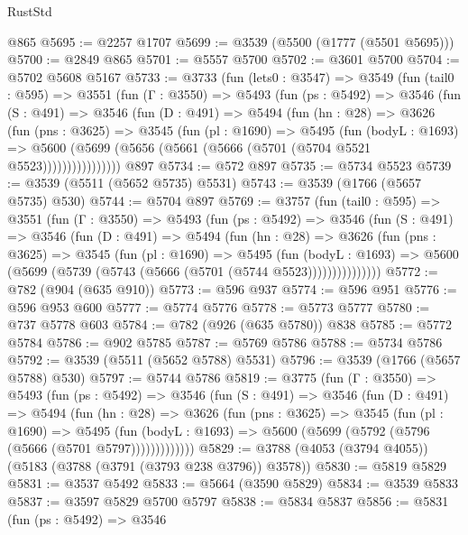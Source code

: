 \begin{lexlean}{RustStd}
\begin{coremodule}
    @865
@5695 := @2257 @1707
@5699 := @3539 (@5500 (@1777 (@5501 @5695)))
@5700 := @2849 @865
@5701 := @5557 @5700
@5702 := @3601 @5700
@5704 := @5702 @5608 @5167
@5733 := @3733
    (fun (lets0 : @3547) =>
    @3549
      (fun (tail0 : @595) =>
      @3551
        (fun (Γ : @3550) =>
        @5493
          (fun (ps : @5492) =>
          @3546
            (fun (S : @491) =>
            @3546
              (fun (D : @491) =>
              @5494
                (fun (hn : @28) =>
                @3626
                  (fun (pns : @3625) =>
                  @3545
                    (fun (pl : @1690) =>
                    @5495
                      (fun (bodyL : @1693) =>
                      @5600 (@5699 (@5656 (@5661 (@5666 (@5701 (@5704 @5521 @5523))))))))))))))))
    @897
@5734 := @572 @897
@5735 := @5734 @5523
@5739 := @3539 (@5511 (@5652 @5735) @5531)
@5743 := @3539 (@1766 (@5657 @5735) @530)
@5744 := @5704 @897
@5769 := @3757
    (fun (tail0 : @595) =>
    @3551
      (fun (Γ : @3550) =>
      @5493
        (fun (ps : @5492) =>
        @3546
          (fun (S : @491) =>
          @3546
            (fun (D : @491) =>
            @5494
              (fun (hn : @28) =>
              @3626
                (fun (pns : @3625) =>
                @3545
                  (fun (pl : @1690) =>
                  @5495
                    (fun (bodyL : @1693) =>
                    @5600 (@5699 (@5739 (@5743 (@5666 (@5701 (@5744 @5523)))))))))))))))
@5772 := @782 (@904 (@635 @910))
@5773 := @596 @937
@5774 := @596 @951
@5776 := @596 @953 @600
@5777 := @5774 @5776
@5778 := @5773 @5777
@5780 := @737 @5778 @603
@5784 := @782 (@926 (@635 @5780)) @838
@5785 := @5772 @5784
@5786 := @902 @5785
@5787 := @5769 @5786
@5788 := @5734 @5786
@5792 := @3539 (@5511 (@5652 @5788) @5531)
@5796 := @3539 (@1766 (@5657 @5788) @530)
@5797 := @5744 @5786
@5819 := @3775
    (fun (Γ : @3550) =>
    @5493
      (fun (ps : @5492) =>
      @3546
        (fun (S : @491) =>
        @3546
          (fun (D : @491) =>
          @5494
            (fun (hn : @28) =>
            @3626
              (fun (pns : @3625) =>
              @3545
                (fun (pl : @1690) =>
                @5495
                  (fun (bodyL : @1693) =>
                  @5600 (@5699 (@5792 (@5796 (@5666 (@5701 @5797)))))))))))))
@5829 := @3788 (@4053 (@3794 @4055)) (@5183 (@3788 (@3791 (@3793 @238 @3796)) @3578))
@5830 := @5819 @5829
@5831 := @3537 @5492
@5833 := @5664 (@3590 @5829)
@5834 := @3539 @5833
@5837 := @3597 @5829 @5700 @5797
@5838 := @5834 @5837
@5856 := @5831
    (fun (ps : @5492) =>
    @3546

\end{coremodule}
\end{lexlean}
